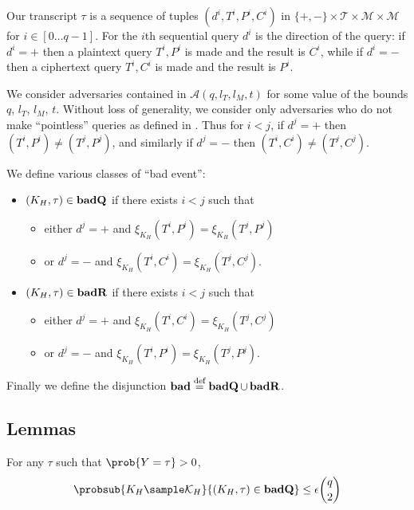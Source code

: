 \documentclass[eprint.tex]{subfiles}
\begin{document}
Our transcript $\tau$ is a sequence of tuples
$(d^i, T^i, P^i, C^i)$
in
$\{+, -\} \times \mathcal{T} \times \mathcal{M} \times \mathcal{M}$
for $i \in [0 \ldots q-1]$.
For the $i$th sequential query
$d^i$ is the direction of the query:
if $d^i = +$ then a plaintext query $T^i, P^i$ is made and the result is $C^i$,
while if $d^i = -$ then a ciphertext query $T^i, C^i$ is made and the result is $P^i$.

We consider adversaries contained in $\mathcal{A}(q, l_T, l_M, t)$ for some value of
the bounds $q$, $l_T$, $l_M$, $t$.
Without loss of generality, we consider only adversaries who do not make ``pointless''
queries as defined in \cite{cmc}. Thus for $i < j$, if $d^j = +$ then
$(T^i, P^i) \neq (T^j, P^j)$, and similarly if $d^j = -$ then
$(T^i, C^i) \neq (T^j, C^j)$.

We define various classes of ``bad event'':

\begin{itemize}
    \item $(K_H, \tau) \in \operatorname{\mathbf{badQ}}$ if there exists $i < j$ such that
    \begin{itemize}
        \item either $d^j = +$ and $\xi_{K_H}(T^i, P^i) = \xi_{K_H}(T^j, P^j)$
        \item or $d^j = -$ and $\xi_{K_H}(T^i, C^i) = \xi_{K_H}(T^j, C^j)$.
    \end{itemize}
    \item $(K_H, \tau) \in \operatorname{\mathbf{badR}}$ if there exists $i < j$ such that
    \begin{itemize}
        \item either $d^j = +$ and $\xi_{K_H}(T^i, C^i) = \xi_{K_H}(T^j, C^j)$
        \item or $d^j = -$ and $\xi_{K_H}(T^i, P^i) = \xi_{K_H}(T^j, P^j)$.
    \end{itemize}
\end{itemize}

Finally we define the disjunction
$\operatorname{\mathbf{bad}} \stackrel{\text{def}}{=} \operatorname{\mathbf{badQ}} \cup \operatorname{\mathbf{badR}}$.

\subsection{Lemmas}
\begin{lemma} \label{badQ}
    For any $\tau$ such that $\prob{Y = \tau} > 0$,
    \begin{displaymath}
        \probsub{K_H \sample \mathcal{K}_H}{(K_H, \tau) \in \badQ}
        \leq \epsilon \binom{q}{2}
    \end{displaymath}
\end{lemma}
\end{document}
